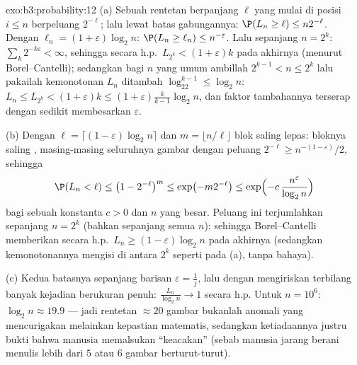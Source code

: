 \begin{solution}{exo:b3:probability:12}
(a) Sebuah rentetan berpanjang $\ell$ yang mulai di posisi $i \leq n$
berpeluang $2^{-\ell}$; lalu lewat batas gabungannya: $\P(L_n \geq \ell)
\leq n2^{-\ell}$. Dengan $\ell_n = (1 +
\varepsilon)\log_2n$: $\P(L_n \geq \ell_n) \leq
n^{-\varepsilon}$. Lalu sepanjang $n = 2^k$:
$\sum_k2^{-k\varepsilon} < \infty$, sehingga secara h.p.\ $L_{2^k} <
(1+\varepsilon)k$ pada akhirnya (menurut Borel--Cantelli); sedangkan bagi $n$
yang umum ambillah $2^{k-1} < n \leq 2^k$ lalu pakailah kemonotonan
$L_n$ ditambah $\log_22^{k-1} \leq \log_2n$: $L_n \leq L_{2^k}
< (1 + \varepsilon)k \leq (1 + \varepsilon)\frac{k}{k-1}
\log_2n$, dan faktor tambahannya terserap dengan sedikit membesarkan
$\varepsilon$.

(b) Dengan $\ell = \lceil(1 - \varepsilon)\log_2n\rceil$ dan
$m = \lfloor n/\ell\rfloor$ blok saling lepas: bloknya saling
, masing-masing seluruhnya gambar dengan peluang $2^{-\ell}
\geq n^{-(1-\varepsilon)}/2$, sehingga
\[
\P(L_n < \ell) \leq \bigl(1 - 2^{-\ell}\bigr)^{m}
\leq \exp\bigl(-m2^{-\ell}\bigr)
\leq \exp\Bigl(-c\,\frac{n^{\varepsilon}}{\log_2n}\Bigr)
\]
bagi sebuah konstanta $c > 0$ dan $n$ yang besar. Peluang ini
terjumlahkan sepanjang $n = 2^k$ (bahkan sepanjang semua $n$):
sehingga Borel--Cantelli memberikan secara h.p.\ $L_n \geq (1 -
\varepsilon)\log_2n$ pada akhirnya (sedangkan kemonotonannya mengisi
di antara $2^k$ seperti pada (a), tanpa bahaya).

(c) Kedua batasnya sepanjang barisan $\varepsilon = \frac1j$, lalu
dengan mengiriskan terbilang banyak kejadian berukuran penuh:
$\frac{L_n}{\log_2n} \to 1$ secara h.p. Untuk $n = 10^6$: $\log_2n
\approx 19.9$ --- jadi rentetan $\approx 20$ gambar bukanlah
anomali yang mencurigakan melainkan kepastian matematis, sedangkan
ketiadaannya justru bukti bahwa manusia memalsukan ``keacakan'' (sebab manusia
jarang berani menulis lebih dari $5$ atau $6$ gambar berturut-turut).
\end{solution}

